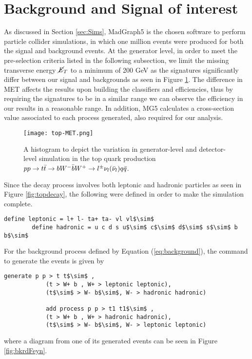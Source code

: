 \section{Background and Signal of interest}
As discussed in Section \ref{sec:Sims}, MadGraph5 is the chosen software to perform particle collider simulations, in which one million events were produced for both the signal and background events. At the generator level, in order to meet the pre-selection criteria listed in the following subsection, we limit the missing transverse energy $\cancel{\it{E}}_{T}$ to a minimum of 200 GeV as the signatures significantly differ between our signal and backgrounds as seen in Figure \ref{fig:topMET}. The difference in MET affects the results upon building the classifiers and efficiencies, thus by requiring the signatures to be in a similar range we can observe the efficiency in our results in a reasonable range. In addition, MG5 calculates a cross-section value associated to each process generated, also required for our analysis. \\

\begin{figure}[htbp]
    \centering
    \texttt{[image: top-MET.png]}
    \caption{A histogram to depict the variation in generator-level and detector-level simulation in the top quark production $pp \rightarrow t\Bar{t} \rightarrow bW^{-}\Bar{b}W^{+} \rightarrow l^{\pm}\nu_l(\Bar{\nu}_l)q\Bar{q}$.}
    \label{fig:topMET}
\end{figure}

Since the decay process involves both leptonic and hadronic particles as seen in Figure \ref{fig:topdecay}, the following were defined in order to make the simulation complete. \\

\begin{lstlisting}[mathescape = true]
        define leptonic = l+ l- ta+ ta- vl vl$\sim$
        define hadronic = u c d s u$\sim$ c$\sim$ d$\sim$ s$\sim$ b b$\sim$
\end{lstlisting}

For the background process defined by Equation (\ref{eq:background}), the command to generate the events is given by
\begin{lstlisting}[mathescape = true]
            generate p p > t t$\sim$ , 
            (t > W+ b , W+ > leptonic leptonic), 
            (t$\sim$ > W- b$\sim$, W- > hadronic hadronic)
        
            add process p p > t1 t1$\sim$ ,
            (t > W+ b , W+ > hadronic hadronic), 
            (t$\sim$ > W- b$\sim$, W- > leptonic leptonic)
\end{lstlisting}
where a diagram from one of its generated events can be seen in Figure \ref{fig:bkrdFeyn}. \\

